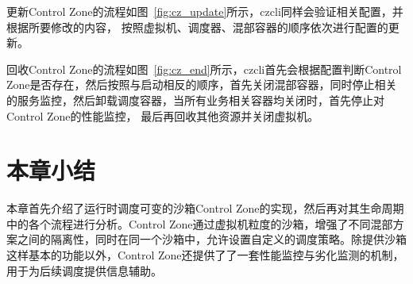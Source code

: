 更新Control Zone的流程如图~\ref{fig:cz_update}所示，czcli同样会验证相关配置，并根据所要修改的内容， 按照虚拟机、调度器、混部容器的顺序依次进行配置的更新。

回收Control Zone的流程如图~\ref{fig:cz_end}所示，czcli首先会根据配置判断Control Zone是否存在，然后按照与启动相反的顺序，首先关闭混部容器，同时停止相关的服务监控，然后卸载调度容器，当所有业务相关容器均关闭时，首先停止对Control Zone的性能监控， 最后再回收其他资源并关闭虚拟机。


\section{本章小结}

本章首先介绍了运行时调度可变的沙箱Control Zone的实现，然后再对其生命周期中的各个流程进行分析。Control Zone通过虚拟机粒度的沙箱，增强了不同混部方案之间的隔离性，同时在同一个沙箱中，允许设置自定义的调度策略。除提供沙箱这样基本的功能以外，Control Zone还提供了了一套性能监控与劣化监测的机制，用于为后续调度提供信息辅助。